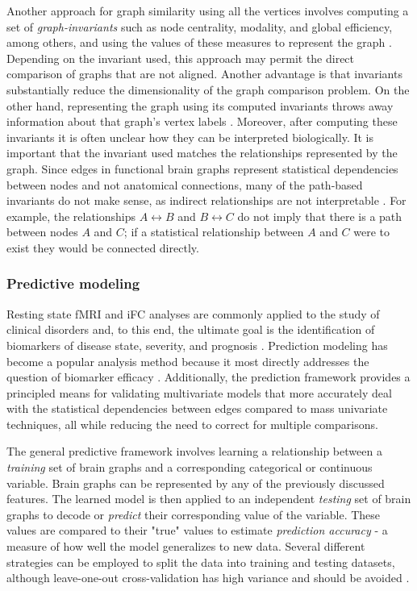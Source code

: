 \documentclass{bmcart}
\begin{document}
Another approach for graph similarity using all the vertices involves computing a set of \emph{graph-invariants} such as node centrality, modality, and global efficiency, among others, and using the values of these measures to represent the graph \cite{Rubinov2010,Bullmore2011}. Depending on the invariant used, this approach may permit the direct comparison of graphs that are not aligned. Another advantage is that invariants substantially reduce the dimensionality of the graph comparison problem. On the other hand, representing the graph using its computed invariants throws away information about that graph's vertex labels \cite{Vogelstein2013}. Moreover, after computing these invariants it is often unclear how they can be interpreted biologically. It is important that the invariant used matches the relationships represented by the graph. Since edges in functional brain graphs represent statistical dependencies between nodes and not anatomical connections, many of the path-based invariants do not make sense, as indirect relationships are not interpretable \cite{Rubinov2010}. For example, the relationships $A \leftrightarrow B$ and $B \leftrightarrow C$ do not imply that there is a path between nodes $A$ and $C$; if a statistical relationship between $A$ and $C$ were to exist they would be connected directly.   

\subsubsection{Predictive modeling}

Resting state fMRI and iFC analyses are commonly applied to the study of clinical disorders and, to this end, the ultimate goal is the identification of biomarkers of disease state, severity, and prognosis \cite{Castellanos2013}. Prediction modeling has become a popular analysis method because it most directly addresses the question of biomarker efficacy \cite{Craddock2009, Dosenbach2010, Richiardi2013}. Additionally, the prediction framework provides a principled means for validating multivariate models that more accurately deal with the statistical dependencies between edges compared to mass univariate techniques, all while reducing the need to correct for multiple comparisons. 

The general predictive framework involves learning a relationship between a \emph{training} set of brain graphs and a corresponding categorical or continuous variable. Brain graphs can be represented by any of the previously discussed features. The learned model is then applied to an independent \emph{testing} set of brain graphs to decode or \emph{predict} their corresponding value of the variable. These values are compared to their "true" values to estimate \emph{prediction accuracy} - a measure of how well the model generalizes to new data. Several different strategies can be employed to split the data into training and testing datasets, although leave-one-out cross-validation has high variance and should be avoided \cite{james2014introduction}. 
\end{document}
